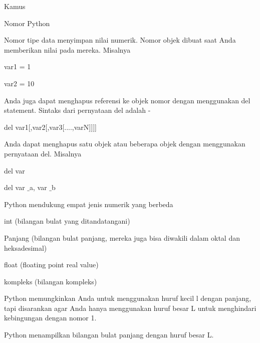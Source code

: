 \noindent 
Kamus \par
\noindent 
Nomor Python \par
\vspace{12pt}
\noindent 
Nomor tipe data menyimpan nilai numerik. $  $Nomor objek dibuat saat Anda memberikan nilai pada mereka. $  $Misalnya  \par
\vspace{12pt}
\noindent 
var1 = 1 \par
\noindent 
var2 = 10 \par
\vspace{12pt}
\noindent 
Anda juga dapat menghapus referensi ke objek nomor dengan menggunakan del statement. $  $Sintaks dari pernyataan del adalah - \par
\vspace{12pt}
\noindent 
del var1[,var2[,var3[....,varN]]]] \par
\vspace{12pt}
\noindent 
Anda dapat menghapus satu objek atau beberapa objek dengan menggunakan pernyataan del. $  $Misalnya  \par
\vspace{12pt}
\noindent 
del var \par
\noindent 
del var $  \_  $a, var $  \_  $b \par
\vspace{12pt}
\noindent 
Python mendukung empat jenis numerik yang berbeda  \par
\vspace{12pt}
\noindent 
int (bilangan bulat yang ditandatangani) \par
\vspace{12pt}
\noindent 
Panjang (bilangan bulat panjang, mereka juga bisa diwakili dalam oktal dan heksadesimal) \par
\vspace{12pt}
\noindent 
float (floating point real value) \par
\vspace{12pt}
\noindent 
kompleks (bilangan kompleks) \par
\vspace{12pt}
\noindent 
Python memungkinkan Anda untuk menggunakan huruf kecil l dengan panjang, tapi disarankan agar Anda hanya menggunakan huruf besar L untuk menghindari kebingungan dengan nomor 1.  \par
\noindent 
Python menampilkan bilangan bulat panjang dengan huruf besar L. \par
\vspace{12pt}
\noindent 
